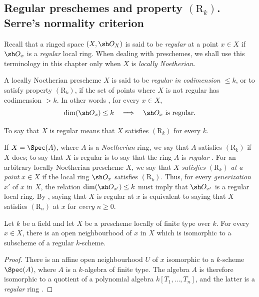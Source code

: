 \subsection{Regular preschemes and property
\texorpdfstring{$(\mathrm{R}_k)$}{(Rk)}. Serre's normality criterion}
\label{subsection:IV.5.8}

\begin{env}[5.8.1]
\label{IV.5.8.1}
Recall  that a ringed space $(X,\sh O_X)$ is said
to be \emph{regular} at a point $x\in X$ if $\sh O_x$ is a \emph{regular}
local ring.  When dealing with preschemes, we shall use this
terminology in this chapter only when $X$ is \emph{locally Noetherian}.
\end{env}

\begin{definition}[5.8.2]
\label{IV.5.8.2}
A locally Noetherian prescheme $X$ is said to be \emph{regular in
codimension $\leq k$}, or \textup{to satisfy property $(\mathrm R_k)$}, if the
set of points where $X$ is not regular has codimension $>k$.  In other
words , for every $x\in X$,
\[
  \dim(\sh O_x)\leq k
  \quad\Longrightarrow\quad
  \sh O_x\ \text{is regular}.
\]
\end{definition}

To say that $X$ is regular means that $X$ satisfies $(\mathrm R_k)$
for every $k$.

If $X=\Spec(A)$, where $A$ is a \emph{Noetherian} ring, we say that $A$
satisfies $(\mathrm R_k)$ if $X$ does; to say that $X$ is regular is
to say that the ring $A$ is \emph{regular} .  For an
arbitrary locally Noetherian prescheme $X$, we say that $X$ \emph{satisfies
$(\mathrm R_k)$ at a point} $x\in X$ if the local ring
$\sh O_x$ satisfies $(\mathrm R_k)$.  Thus, for every \emph{generization}
$x'$ of $x$ in $X$, the relation
$\dim(\sh O_{x'})\leq k$ must imply that $\sh O_{x'}$ is a regular
local ring.  By , saying that $X$ is regular at
$x$ is equivalent to saying that $X$ satisfies $(\mathrm R_n)$ at
$x$ for \emph{every} $n\geq0$.

\begin{proposition}[5.8.3]
\label{IV.5.8.3}
Let $k$ be a field and let $X$ be a prescheme locally of finite type
over $k$.  For every $x\in X$, there is an open neighbourhood of $x$
in $X$ which is isomorphic to a subscheme of a regular $k$-scheme.
\end{proposition}

\begin{proof}
There is an affine open neighbourhood $U$ of $x$ isomorphic to a
$k$-scheme $\Spec(A)$, where $A$ is a $k$-algebra of finite type.
The algebra $A$ is therefore isomorphic to a quotient of a polynomial
algebra $k[T_1,\ldots,T_n]$, and the latter is a \emph{regular} ring
.
\end{proof}

